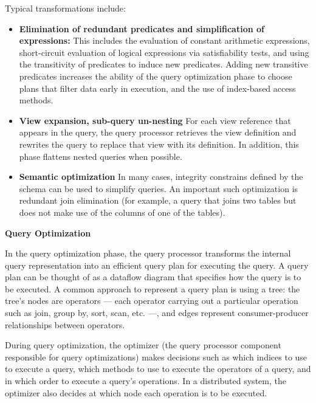 Typical transformations include:
\begin{itemize}

  \item \textbf{Elimination of redundant predicates and simplification of expressions:}
  This includes the evaluation of constant arithmetic expressions,
  short-circuit evaluation of logical expressions via satisfiability tests,
  and using the transitivity of predicates to induce new predicates.
  Adding new transitive predicates increases the ability of the query optimization phase to choose plans that filter
  data early in execution, and the use of index-based access methods.

  \item \textbf{View expansion, sub-query un-nesting}
  For each view reference that appears in the query, the query processor retrieves the view definition
  and rewrites the query to replace that view with its definition.
  In addition, this phase flattens nested queries when possible.

  \item \textbf{Semantic optimization}
  In many cases, integrity constrains defined by the schema can be used to simplify queries.
  An important such optimization is redundant join elimination (for example, a query that joins two tables but does not
  make use of the columns of one of the tables).

\end{itemize}

\bigskip
\noindent
\textbf{Query Optimization}

In the query optimization phase, the query processor transforms the internal query representation into an efficient query
plan for executing the query.
A query plan can be thought of as a dataflow diagram that specifies how the query is to be executed.
A common approach to represent a query plan is using a tree:
the tree's nodes are operators
--- each operator carrying out a particular operation such as join, group by, sort, scan, etc. ---,
and edges  represent consumer-producer relationships between operators.

During query optimization, the optimizer (the query processor component responsible for query optimizations)
makes decisions such as which indices to use to execute a query,
which methods to use to execute the operators of a query,
and in which order to execute a query's operations.
In a distributed system, the optimizer also decides at which node each operation is to be executed.


